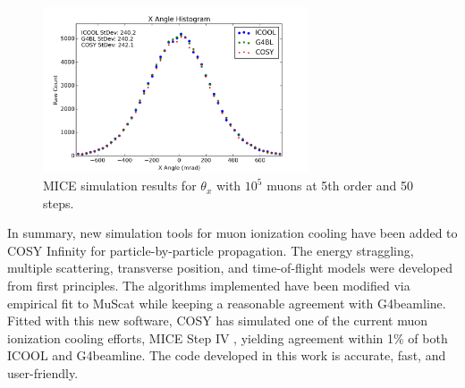 \begin{figure}[H]
  \centering
    \includegraphics[width=0.7\textwidth]{MICE data/upstream/px} 
  \caption{MICE simulation results for $\theta_x$ with $10^5$ muons at 5th order and 50 steps.}
  \label{fig:uppx}
\end{figure}

\label{sec:summary}

In summary, new simulation tools for muon ionization cooling have been added to COSY Infinity for particle-by-particle propagation. The energy straggling, multiple scattering, transverse position, and time-of-flight models were developed from first principles. The algorithms implemented have been modified via empirical fit to MuScat \cite{muscat} while keeping a reasonable agreement with G4beamline. Fitted with this new software, COSY has simulated one of the current muon ionization cooling efforts, MICE Step IV \cite{mice}, yielding agreement within 1\% of both ICOOL and G4beamline. The code developed in this work is accurate, fast, and user-friendly.